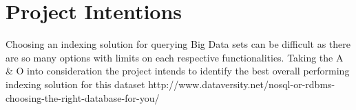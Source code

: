 \section{Project Intentions}
Choosing an indexing solution for querying Big Data sets can be difficult as there are so many options with limits on each respective functionalities. Taking the A \& O into consideration the project intends to identify the best overall performing indexing solution for this dataset 
http://www.dataversity.net/nosql-or-rdbms-choosing-the-right-database-for-you/